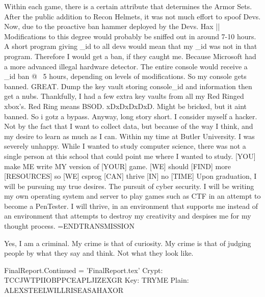 Within each game, there is a certain attribute that determines the Armor Sets.
After the public addition to Recon Helmets, it was not much effort to spoof Devs.
Now, due to the proactive ban hammer deployed by the Devs. Hax || Modifications to this degree
would probably be sniffed out in around 7-10 hours. A short program giving _id to all devs
would mean that my _id was not in that program. Therefore I would get a ban, if they caught me.
Because Microsoft had a more advanced illegal hardware detector. The entire console would receive
a _id ban @ ~5 hours, depending on levels of modifications. 
So my console gets banned. GREAT. Dump the key vault storing console_id and information
then get a nubs. Thankfully, I had a few extra key vaults from all my Red Ringed xbox's.
Red Ring means BSOD. xDxDxDxDxD. Might be bricked, but it aint banned. So i gotz a bypass.
Anyway, long story short. I consider myself a hacker. Not by the fact that I want to collect data,
but because of the way I think, and my desire to learn as much as I can. 
Within my time at Butler University. I was severely unhappy. While I wanted to study computer science,
there was not a single person at this school that could point me where I wanted to study.
[YOU] make {ME} write {MY} version of [YOUR] game.
[WE] should [FIND] more [RESOURCES] so [WE] csprog [CAN] thrive [IN] no [TIME]
Upon graduation, I will be pursuing my true desires. The pursuit of cyber security.
I will be writing my own operating system and server to play games such as CTF
in an attempt to become a PenTester. I will thrive, in an environment that supports me
instead of an environment that attempts to destroy my creativity and despises me for my thought process.
=ENDTRANSMISSION

Yes, I am a criminal. My crime is that of curiosity. 
My crime is that of judging people by what they say and think. 
Not what they look like.

FinalReport.Continued = 'FinalReport.tex'
Crypt: TCCJWTPIIOBPPCEAPLJIZEXGR 
Key: TRYME
Plain: ALEXSTEELWILLRISEASAHAXOR
